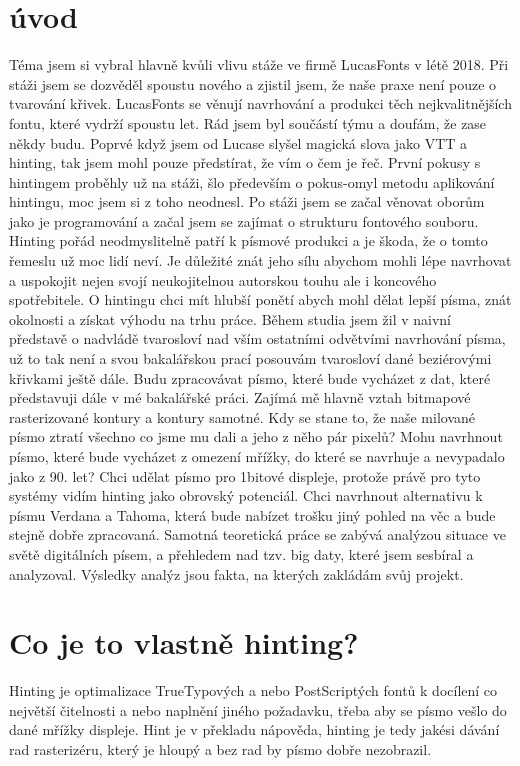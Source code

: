 \documentclass[a4paper]{article}
\begin{document}
\section{úvod}
\setcounter{page}{1}
Téma jsem si vybral hlavně kvůli vlivu stáže ve firmě LucasFonts v létě 2018. Při stáži jsem se dozvěděl spoustu nového a zjistil jsem, že naše praxe není pouze o tvarování křivek. LucasFonts se věnují navrhování a produkci těch nejkvalitnějších fontu, které vydrží spoustu let. Rád jsem byl součástí týmu a doufám, že zase někdy budu. Poprvé když jsem od Lucase slyšel magická slova jako VTT a hinting, tak jsem mohl pouze předstírat, že vím o čem je řeč. První pokusy s hintingem proběhly už na stáži, šlo především o pokus-omyl metodu aplikování hintingu, moc jsem si z toho neodnesl. Po stáži jsem se začal věnovat oborům jako je programování a začal jsem se zajímat o strukturu fontového souboru. Hinting pořád neodmyslitelně patří k písmové produkci a je škoda, že o tomto řemeslu už moc lidí neví. Je důležité znát jeho sílu abychom mohli lépe navrhovat a uspokojit nejen svojí neukojitelnou autorskou touhu ale i koncového spotřebitele. O hintingu chci mít hlubší ponětí abych mohl dělat lepší písma, znát okolnosti a získat výhodu na trhu práce. Během studia jsem žil v naivní představě o nadvládě tvarosloví nad vším ostatními odvětvími navrhování písma, už to tak není a svou bakalářskou prací posouvám tvarosloví dané beziérovými křivkami ještě dále. Budu zpracovávat písmo, které bude vycházet z dat, které představuji dále v mé bakalářské práci. Zajímá mě hlavně vztah bitmapové rasterizované kontury a kontury samotné. Kdy se stane to, že naše milované písmo ztratí všechno co jsme mu dali a jeho z něho pár pixelů? Mohu navrhnout písmo, které bude vycházet z omezení mřížky, do které se navrhuje a nevypadalo jako z 90. let? Chci udělat písmo pro 1bitové displeje, protože právě pro tyto systémy vidím hinting jako obrovský potenciál. Chci navrhnout alternativu k písmu Verdana a Tahoma, která bude nabízet trošku jiný pohled na věc a bude stejně dobře zpracovaná. Samotná teoretická práce se zabývá analýzou situace ve světě digitálních písem, a přehledem nad tzv. big daty, které jsem sesbíral a analyzoval. Výsledky analýz jsou fakta, na kterých zakládám svůj projekt.

\section{Co je to vlastně hinting?}

Hinting je optimalizace TrueTypových a nebo PostScriptých fontů k docílení co největší čitelnosti a nebo naplnění jiného požadavku, třeba aby se písmo vešlo do dané mřížky displeje. Hint je v překladu nápověda, hinting je tedy jakési dávání rad rasterizéru, který je hloupý a bez rad by písmo dobře nezobrazil. 
\end{document}
